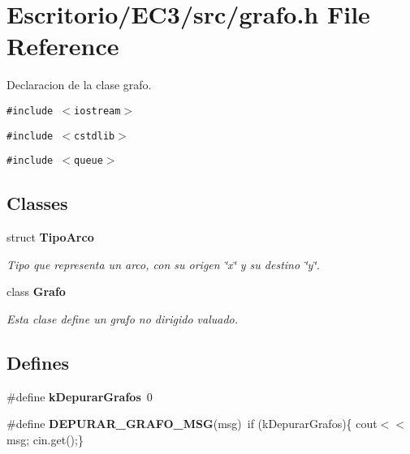 \section{Escritorio/EC3/src/grafo.h File Reference}
\label{grafo_8h}
Declaracion de la clase grafo. 

{\tt \#include $<$iostream$>$}\par
{\tt \#include $<$cstdlib$>$}\par
{\tt \#include $<$queue$>$}\par
\subsection*{Classes}
\begin{CompactItemize}
\item 
struct {\bf TipoArco}
\begin{CompactList}\small\item\em Tipo que representa un arco, con su origen \char`\"{}x\char`\"{} y su destino \char`\"{}y\char`\"{}. \item\end{CompactList}\item 
class {\bf Grafo}
\begin{CompactList}\small\item\em Esta clase define un grafo no dirigido valuado. \item\end{CompactList}\end{CompactItemize}
\subsection*{Defines}
\begin{CompactItemize}
\item 
\#define {\bf kDepurarGrafos}~0
\item 
\#define {\bf DEPURAR\_\-GRAFO\_\-MSG}(msg)~if (kDepurarGrafos)\{ cout$<$$<$msg; cin.get();\}
\end{CompactItemize}
